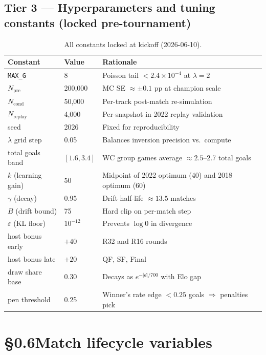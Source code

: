 \documentclass[11pt,letterpaper]{article}
\begin{document}
\subsection*{Tier 3 --- Hyperparameters and tuning constants (locked pre-tournament)}

\begin{table}[H]
\centering
\caption{All constants locked at kickoff (2026-06-10).}
\label{tab:tier3}
\small
\begin{tabular}{llp{7cm}}
\toprule
Constant & Value & Rationale \\
\midrule
\texttt{MAX\_G}       & 8      & Poisson tail $<2.4\times10^{-4}$ at $\lambda=2$ \\
$N_{\mathrm{pre}}$    & 200{,}000 & MC SE $\approx\pm0.1$ pp at champion scale \\
$N_{\mathrm{cond}}$   & 50{,}000  & Per-track post-match re-simulation \\
$N_{\mathrm{replay}}$ & 4{,}000   & Per-snapshot in 2022 replay validation \\
seed                  & 2026   & Fixed for reproducibility \\
$\lambda$ grid step   & 0.05   & Balances inversion precision vs.\ compute \\
total goals band      & $[1.6,3.4]$ & WC group games average $\approx2.5$--2.7 total goals \\
$k$ (learning gain)   & 50     & Midpoint of 2022 optimum (40) and 2018 optimum (60) \\
$\gamma$ (decay)      & 0.95   & Drift half-life $\approx13.5$ matches \\
$B$ (drift bound)     & 75     & Hard clip on per-match step \\
$\varepsilon$ (KL floor) & $10^{-12}$ & Prevents $\log0$ in divergence \\
host bonus early      & $+40$  & R32 and R16 rounds \\
host bonus late       & $+20$  & QF, SF, Final \\
draw share base       & 0.30   & Decays as $e^{-|d|/700}$ with Elo gap \\
pen threshold         & 0.25   & Winner's rate edge $<0.25$ goals $\Rightarrow$ penalties pick \\
\bottomrule
\end{tabular}
\end{table}

\section*{\S 0.6\quad Match lifecycle variables}
\label{sec:lifecycle}
\end{document}
